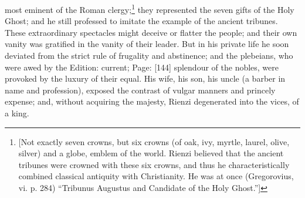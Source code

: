 most eminent of the Roman clergy;\footnote{[Not exactly seven crowns, but six crowns (of oak, ivy, myrtle, laurel, olive, silver) and a globe, emblem of the world. Rienzi believed that the ancient tribunes were crowned with these six crowns, and thus he characteristically combined classical antiquity with Christianity. He was at once (Gregorovius, vi. p. 284) \texthebrew{“}Tribunus Augustus and Candidate of the Holy Ghost.\texthebrew{}”]} they represented the seven gifts of the Holy Ghost; and he still professed to imitate the example of the ancient tribunes. These extraordinary spectacles might deceive or flatter the people; and their own vanity was gratified in the vanity of their leader. But in his private life he soon deviated from the strict rule of frugality and abstinence; and the plebeians, who were awed by the Edition: current; Page: [144] splendour of the nobles, were provoked by the luxury of their equal. His wife, his son, his uncle (a barber in name and profession), exposed the contrast of vulgar manners and princely expense; and, without acquiring the majesty, Rienzi degenerated into the vices, of a king.

